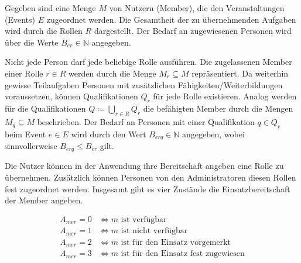 \documentclass[a4paper,12pt]{scrartcl}
\begin{document}
Gegeben sind eine Menge $M$ von Nutzern (Member), die den Veranstaltungen (Events) $E$ zugeordnet werden. Die Gesamtheit der zu übernehmenden Aufgaben wird durch die Rollen $R$ dargestellt. Der Bedarf an zugewiesenen Personen wird über die Werte $B_{er}\in \mathbb{N}$ angegeben. 

Nicht jede Person darf jede beliebige Rolle ausführen. Die zugelassenen Member einer Rolle $r\in R$ werden durch die Menge $M_r\subseteq M$ repräsentiert. Da weiterhin gewisse Teilaufgaben Personen mit zusätzlichen Fähigkeiten/Weiterbildungen voraussetzen, können Qualifikationen $Q_r$ für jede Rolle existieren. Analog werden für die Qualifikationen $Q\coloneqq \bigcup_{r\in R} Q_r$ die befähigten Member durch die Mengen $M_q\subseteq M$ beschrieben. Der Bedarf an Personen mit einer Qualifikation $q\in Q_r$ beim Event $e\in E$ wird durch den Wert $B_{erq}\in \mathbb{N}$ angegeben, wobei sinnvollerweise $B_{erq} \leq B_{er}$ gilt.

Die Nutzer können in der Anwendung ihre Bereitschaft angeben eine Rolle zu übernehmen. Zusätzlich können Personen von den Administratoren diesen Rollen fest zugeordnet werden. Insgesamt gibt es vier Zustände die Einsatzbereitschaft der Member angeben. 

\begin{align*}
    A_{mer} = 0 &\iff m \text{ ist verfügbar}\\
    A_{mer} = 1 &\iff m \text{ ist nicht verfügbar}\\
    A_{mer} = 2 &\iff m \text{ ist für den Einsatz vorgemerkt}\\
    A_{mer} = 3 &\iff m \text{ ist für den Einsatz fest zugewiesen}\\
\end{align*}
\end{document}
